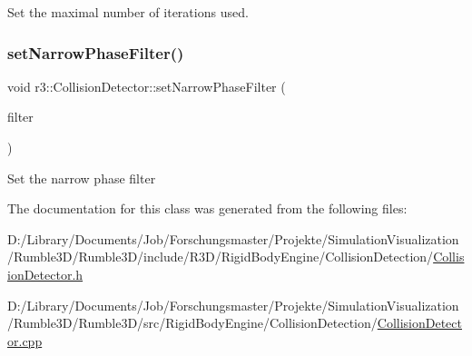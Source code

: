Set the maximal number of iterations used. \mbox{\label{classr3_1_1_collision_detector_a98f6ab749622d7fcffbdc0dcf59cfa75}} 
\subsubsection{\texorpdfstring{set\+Narrow\+Phase\+Filter()}{setNarrowPhaseFilter()}}
{\footnotesize\ttfamily void r3\+::\+Collision\+Detector\+::set\+Narrow\+Phase\+Filter (\begin{DoxyParamCaption}\item[{\mbox{\hyperlink{classr3_1_1_collision_detector_a094cc287cba14d5a063cfca41e667008}{Narrow\+Phase\+Filter\+\_\+\+Ptr}}}]{filter }\end{DoxyParamCaption})}

Set the narrow phase filter 

The documentation for this class was generated from the following files\+:\begin{DoxyCompactItemize}
\item 
D\+:/\+Library/\+Documents/\+Job/\+Forschungsmaster/\+Projekte/\+Simulation\+Visualization/\+Rumble3\+D/\+Rumble3\+D/include/\+R3\+D/\+Rigid\+Body\+Engine/\+Collision\+Detection/\mbox{\hyperlink{_collision_detector_8h}{Collision\+Detector.\+h}}\item 
D\+:/\+Library/\+Documents/\+Job/\+Forschungsmaster/\+Projekte/\+Simulation\+Visualization/\+Rumble3\+D/\+Rumble3\+D/src/\+Rigid\+Body\+Engine/\+Collision\+Detection/\mbox{\hyperlink{_collision_detector_8cpp}{Collision\+Detector.\+cpp}}\end{DoxyCompactItemize}
